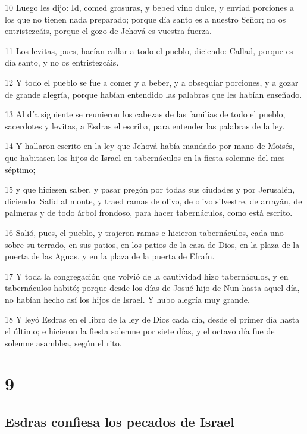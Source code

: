 \par 10 Luego les dijo: Id, comed grosuras, y bebed vino dulce, y enviad porciones a los que no tienen nada preparado; porque día santo es a nuestro Señor; no os entristezcáis, porque el gozo de Jehová es vuestra fuerza.
\par 11 Los levitas, pues, hacían callar a todo el pueblo, diciendo: Callad, porque es día santo, y no os entristezcáis.
\par 12 Y todo el pueblo se fue a comer y a beber, y a obsequiar porciones, y a gozar de grande alegría, porque habían entendido las palabras que les habían enseñado.
\par 13 Al día siguiente se reunieron los cabezas de las familias de todo el pueblo, sacerdotes y levitas, a Esdras el escriba, para entender las palabras de la ley.
\par 14 Y hallaron escrito en la ley que Jehová había mandado por mano de Moisés, que habitasen los hijos de Israel en tabernáculos en la fiesta solemne del mes séptimo;
\par 15 y que hiciesen saber, y pasar pregón por todas sus ciudades y por Jerusalén, diciendo: Salid al monte, y traed ramas de olivo, de olivo silvestre, de arrayán, de palmeras y de todo árbol frondoso, para hacer tabernáculos, como está escrito. 
\par 16 Salió, pues, el pueblo, y trajeron ramas e hicieron tabernáculos, cada uno sobre su terrado, en sus patios, en los patios de la casa de Dios, en la plaza de la puerta de las Aguas, y en la plaza de la puerta de Efraín.
\par 17 Y toda la congregación que volvió de la cautividad hizo tabernáculos, y en tabernáculos habitó; porque desde los días de Josué hijo de Nun hasta aquel día, no habían hecho así los hijos de Israel. Y hubo alegría muy grande.
\par 18 Y leyó Esdras en el libro de la ley de Dios cada día, desde el primer día hasta el último; e hicieron la fiesta solemne por siete días, y el octavo día fue de solemne asamblea, según el rito.

\chapter{9}

\section*{Esdras confiesa los pecados de Israel}

